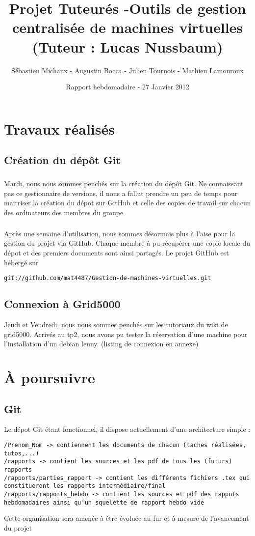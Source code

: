\documentclass{report}
\begin{document}
\title{Projet Tuteurés -Outils de gestion centralisée de machines virtuelles (Tuteur : Lucas Nussbaum) }
\author{Sébastien Michaux - Augustin Bocca - Julien Tournois - Mathieu Lamouroux}
\date{Rapport hebdomadaire - 27 Janvier 2012}
\maketitle
\chapter{Travaux réalisés}
\section{Création du dépôt Git}
\paragraph{}
Mardi, nous nous sommes penchés sur la création du dépôt Git.
Ne connaissant pas ce gestionnaire de versions, il nous a fallut prendre un peu de temps pour maitriser la création du dépot sur GitHub et celle des copies de travail sur chacun des ordinateurs des membres du groupe
\paragraph{}
Après une semaine d'utilisation, nous sommes désormais plus à l'aise pour la gestion du projet via GitHub. Chaque membre à pu récupérer une copie locale du dépot et des premiers documents sont ainsi partagés.
Le projet GitHub est hébergé sur 
\begin{verbatim}
git://github.com/mat4487/Gestion-de-machines-virtuelles.git
\end{verbatim}

\section{Connexion à Grid5000}
Jeudi et Vendredi, nous nous sommes penchés sur les tutoriaux du wiki de grid5000.
Arrivés au tp2, nous avons pu tester la réservation d'une machine pour l'installation d'un debian lenny. (listing de connexion en annexe)

\chapter{À poursuivre}
\section{Git}
Le dépot Git étant fonctionnel, il dispose actuellement d'une architecture simple :
\begin{verbatim}
/Prenom_Nom -> contiennent les documents de chacun (taches réalisées, tutos,...)
/rapports -> contient les sources et les pdf de tous les (futurs) rapports
/rapports/parties_rapport -> contient les différents fichiers .tex qui constitueront les rapports intermédiaire/final
/rapports/rapports_hebdo -> contient les sources et pdf des rappots hebdomadaires ainsi qu'un squelette de rapport hebdo vide
\end{verbatim}
Cette organisation sera amenée à être évoluée au fur et à mesure de l'avancement du projet
\end{document}
